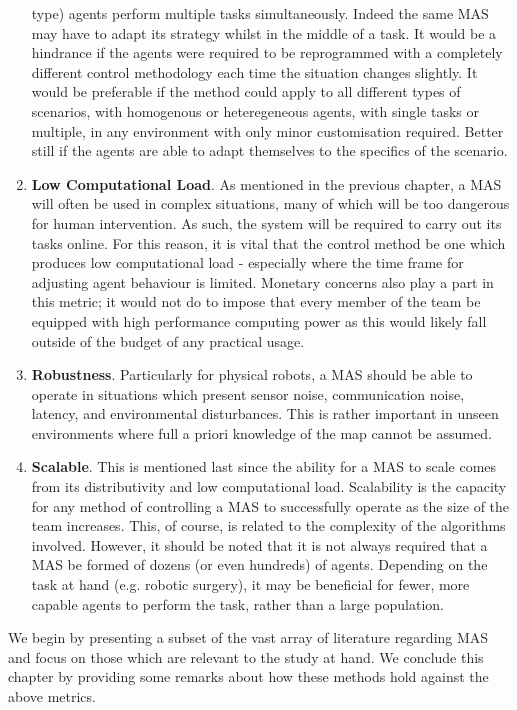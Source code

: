 \documentclass[.../main.tex]{subfiles}
\begin{document}
\begin{enumerate}
type) agents perform multiple tasks simultaneously. Indeed the same MAS may have to adapt its
strategy whilst in the middle of a task. It would be a hindrance if the agents were required to be
reprogrammed with a completely different control methodology each time the situation changes
slightly. It would be preferable if the method could apply to all different types of scenarios, with
homogenous or heteregeneous agents, with single tasks or multiple, in any environment with only
minor customisation required. Better still if the agents are able to adapt themselves to the
specifics of the scenario.
    \item \textbf{Low Computational Load}. As mentioned in the previous chapter, a MAS will often be
used in complex situations, many of which will be too dangerous for human intervention. As such, the
system will be required to carry out its tasks online. For this reason, it is vital that the control
method be one which produces low computational load - especially where the time frame for adjusting
agent behaviour is limited. Monetary concerns also play a part in this metric; it would not do to
impose that every member of the team be equipped with high performance computing power as this would
likely fall outside of the budget of any practical usage.
    \item \textbf{Robustness}. Particularly for physical robots, a MAS should be able to operate in
situations which present sensor noise, communication noise, latency, and environmental disturbances.
This is rather important in unseen environments where full a priori knowledge of the map cannot be
assumed.
    \item \textbf{Scalable}. This is mentioned last since the ability for a MAS to scale comes from
its distributivity  and low computational load. Scalability is the capacity for any method of
controlling a MAS to successfully operate as the size of the team increases. This, of course, is
related to the complexity of the algorithms involved. However, it should be noted that it is not
always required that a MAS be formed of dozens (or even hundreds) of agents. Depending on the task
at hand (e.g. robotic surgery), it may be beneficial for fewer, more capable agents to perform the
task, rather than a large population. 
\end{enumerate}

We begin by presenting a subset of the vast array of literature regarding MAS and focus on those
which are relevant to the study at hand. We conclude this chapter by providing some remarks about
how these methods hold against the above metrics.
\end{document}
